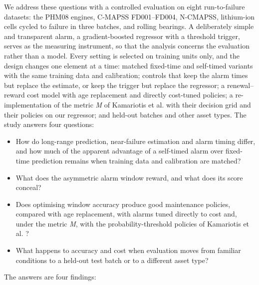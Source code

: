 \documentclass[a4paper,fleqn,doubleblind]{cas-dc}
\begin{document}
We address these questions with a controlled evaluation on eight run-to-failure datasets: the PHM08 engines, C-MAPSS FD001--FD004, N-CMAPSS, lithium-ion cells cycled to failure in three batches, and rolling bearings. A deliberately simple and transparent alarm, a gradient-boosted regressor with a threshold trigger, serves as the measuring instrument, so that the analysis concerns the evaluation rather than a model. Every setting is selected on training units only, and the design changes one element at a time: matched fixed-time and self-timed variants with the same training data and calibration; controls that keep the alarm times but replace the estimate, or keep the trigger but replace the regressor; a renewal--reward cost model with age replacement and directly cost-tuned policies; a re-implementation of the metric \textit{M} of Kamariotis et al. \cite{kamariotis2024} with their decision grid and their policies on our regressor; and held-out batches and other asset types. The study answers four questions:

\begin{itemize}[leftmargin=1.2em,itemsep=2pt]
\item[(Q1)] How do long-range prediction, near-failure estimation and alarm timing differ, and how much of the apparent advantage of a self-timed alarm over fixed-time prediction remains when training data and calibration are matched?
\item[(Q2)] What does the asymmetric alarm window reward, and what does its score conceal?
\item[(Q3)] Does optimising window accuracy produce good maintenance policies, compared with age replacement, with alarms tuned directly to cost and, under the metric \textit{M}, with the probability-threshold policies of Kamariotis et al. \cite{kamariotis2024}?
\item[(Q4)] What happens to accuracy and cost when evaluation moves from familiar conditions to a held-out test batch or to a different asset type?
\end{itemize}

The answers are four findings:
\end{document}
